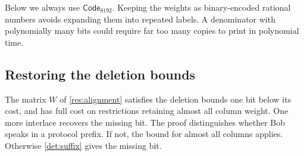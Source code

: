\documentclass[11pt,letterpaper]{article} \usepackage[utf8]{inputenc}
\theoremstyle{plain} \newtheorem{theorem}{Theorem}[section]
\theoremstyle{definition} \newaliascnt{definition}{theorem}
\begin{document}
Below we always use $\mathsf{Code}_{8192}$.
Keeping the weights as binary-encoded rational numbers avoids expanding them
into repeated labels. A denominator with polynomially many bits could require
far too many copies to print in polynomial time.

\subsection{Restoring the deletion bounds}

The matrix $W$ of \cref{res:alignment} satisfies the deletion bounds one bit below
its cost, and has full cost on restrictions retaining almost all column weight. One more interlace
recovers the missing bit. The proof distinguishes whether Bob speaks in a protocol prefix. If not, the bound for almost all columns applies. Otherwise
\cref{det:suffix} gives the missing bit.
\end{document}
